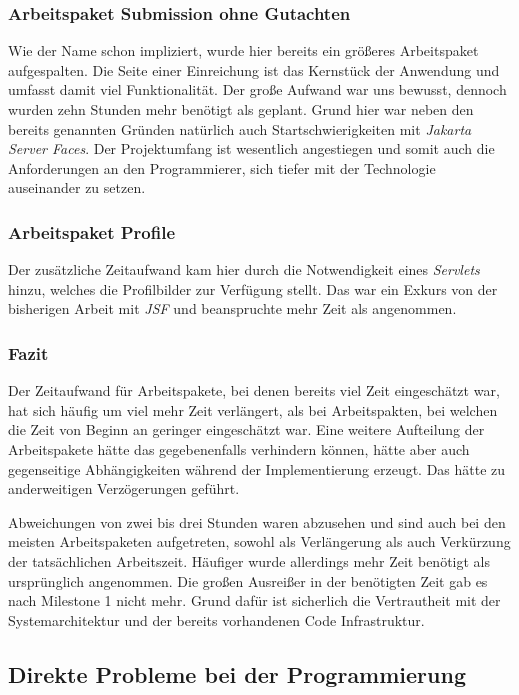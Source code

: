 \subsubsection{Arbeitspaket Submission ohne Gutachten}

Wie der Name schon impliziert, wurde hier bereits ein größeres Arbeitspaket aufgespalten. Die Seite einer Einreichung ist das Kernstück der Anwendung und umfasst damit viel Funktionalität. Der große Aufwand war uns bewusst, dennoch wurden zehn Stunden mehr benötigt als geplant. Grund hier war neben den bereits genannten Gründen natürlich auch Startschwierigkeiten mit \emph{Jakarta Server Faces}. Der Projektumfang ist wesentlich angestiegen und somit auch die Anforderungen an den Programmierer, sich tiefer mit der Technologie auseinander zu setzen.

\subsubsection{Arbeitspaket Profile}

Der zusätzliche Zeitaufwand kam hier durch die Notwendigkeit eines \emph{Servlets} hinzu, welches die Profilbilder zur Verfügung stellt.
Das war ein Exkurs von der bisherigen Arbeit mit \emph{JSF} und beanspruchte
mehr Zeit als angenommen.

\subsubsection{Fazit}

Der Zeitaufwand für Arbeitspakete, bei denen bereits viel Zeit eingeschätzt war, hat sich häufig um viel mehr Zeit verlängert, als bei Arbeitspakten, bei welchen die Zeit von Beginn an geringer eingeschätzt war. Eine weitere Aufteilung der Arbeitspakete hätte das gegebenenfalls verhindern können, hätte aber auch gegenseitige Abhängigkeiten während der Implementierung erzeugt. Das hätte zu anderweitigen Verzögerungen geführt.

Abweichungen von zwei bis drei Stunden waren abzusehen und sind auch bei den meisten Arbeitspaketen aufgetreten, sowohl als Verlängerung als auch Verkürzung der tatsächlichen Arbeitszeit. Häufiger wurde allerdings mehr Zeit benötigt als ursprünglich angenommen. Die großen Ausreißer in der benötigten Zeit gab es nach Milestone 1 nicht mehr. Grund dafür ist sicherlich die Vertrautheit mit der
Systemarchitektur und der bereits vorhandenen Code Infrastruktur.

\subsection{Direkte Probleme bei der Programmierung}

